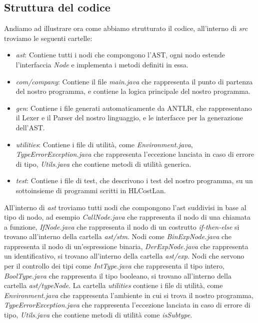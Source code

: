 \documentclass[../../main.tex]{subfiles}
\begin{document}
\subsection{Struttura del codice}
Andiamo ad illustrare ora come abbiamo strutturato il codice, all'interno di \textit{src} troviamo le seguenti cartelle:
\begin{itemize}
    \item \textit{ast}: Contiene tutti i nodi che compongono l'AST, ogni nodo estende l'interfaccia \textit{Node} e implementa i metodi definiti in essa.
    \item \textit{com/company}: Contiene il file \textit{main.java} che rappresenta il punto di partenza del nostro programma, e contiene la logica principale del nostro programma.
    \item \textit{gen}: Contiene i file generati automaticamente da ANTLR, che rappresentano il Lexer e il Parser del nostro linguaggio, e le interfacce per la generazione dell'AST.
    \item \textit{utilities}: Contiene i file di utilità, come \textit{Environment.java}, \textit{TypeErrorException.java} che rappresenta l'eccezione lanciata in caso di errore di tipo, \textit{Utils.java} che contiene metodi di utilità generica.
    \item \textit{test}: Contiene i file di test, che descrivono i test del nostro programma, su un sottoinsieme di programmi scritti in HLCostLan.
\end{itemize}
All'interno di \textit{ast} troviamo tutti nodi che compongono l'ast suddivisi in base al tipo di nodo, ad esempio \textit{CallNode.java} che rappresenta il nodo di una chiamata a funzione, \textit{IfNode.java} che rappresenta il nodo di un costrutto \textit{if-then-else} si trovano all'interno della cartella \textit{ast/stm}.
Nodi come \textit{BinExpNode.java} che rappresenta il nodo di un'espressione binaria, \textit{DerExpNode.java} che rappresenta un identificativo, si trovano all'interno della cartella \textit{ast/exp}.
Nodi che servono per il controllo dei tipi come \textit{IntType.java} che rappresenta il tipo intero, \textit{BoolType.java} che rappresenta il tipo booleano, si trovano all'interno della cartella \textit{ast/typeNode}.
La cartella \textit{utilities} contiene i file di utilità, come \textit{Environment.java} che rappresenta l'ambiente in cui si trova il nostro programma, \textit{TypeErrorException.java} che rappresenta l'eccezione lanciata in caso di errore di tipo, \textit{Utils.java} che contiene metodi di utilità come \textit{isSubtype}.\\
\end{document}
